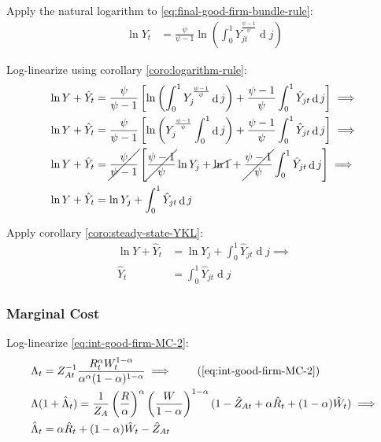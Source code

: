 \documentclass[
	12pt, 
	]{article}
\numberwithin{equation}{section}
\DeclareMathOperator{\dif}{d}
\theoremstyle{definition}
\theoremstyle{plain}
\theoremstyle{plain}
\theoremstyle{plain}
\begin{document}
Apply the natural logarithm to \ref{eq:final-good-firm-bundle-rule}:
\begin{align}
	\ln Y_t &= \frac{\psi}{\psi-1} \ln \left( \int_{0}^{1} Y_{jt}^{\frac{\psi-1}{\psi}} \dif j \right) \nonumber
\end{align}

Log-linearize using corollary \ref{coro:logarithm-rule}:
\begin{align}
	\ln Y + \hat{Y}_t &= \frac{\psi}{\psi-1} \left[ \ln \left( \int_{0}^{1} Y_{j}^{\frac{\psi-1}{\psi}} \dif j \right) + \frac{\psi-1}{\psi} \int_{0}^{1} \hat{Y}_{jt} \dif j \right] \implies \nonumber
\\
	\ln Y + \hat{Y}_t &= \frac{\psi}{\psi-1} \left[ \ln \left( Y_{j}^{\frac{\psi-1}{\psi}} \int_{0}^{1} \dif j \right) + \frac{\psi-1}{\psi} \int_{0}^{1} \hat{Y}_{jt} \dif j \right] \implies \nonumber
\\
	\ln Y + \hat{Y}_t &= \cancel{\frac{\psi}{\psi-1}} \left[ \cancel{\frac{\psi-1}{\psi}} \ln Y_{j} + \cancel{\ln1} + \cancel{\frac{\psi-1}{\psi}} \int_{0}^{1} \hat{Y}_{jt} \dif j \right] \implies \nonumber
	\\
	\ln Y + \hat{Y}_t &= \ln Y_{j} + \int_{0}^{1} \hat{Y}_{jt} \dif j \nonumber
\end{align}

Apply corollary \ref{coro:steady-state-YKL}:
\begin{align}
	\ln Y + \hat{Y}_t &= \ln Y_{j} + \int_{0}^{1} \hat{Y}_{jt} \dif j \implies \nonumber \\
	\hat{Y}_t &= \int_{0}^{1} \hat{Y}_{jt} \dif j 
	\label{eq:ll-final-good-firm-bundle-rule}
\end{align}


\subsubsection{Marginal Cost}

Log-linearize \ref{eq:int-good-firm-MC-2}:
\begin{alignat}{2}
	& \Lambda_t = Z_{At}^{-1} \frac{R_t^{\alpha} W_t^{1-\alpha} }{ \alpha^{\alpha} (1-\alpha)^{1-\alpha} } \implies \tag{\ref{eq:int-good-firm-MC-2}} \\
	& \Lambda (1+ \hat{\Lambda}_t) = \frac{1}{Z_{A}} \left( \frac{R}{\alpha} \right)^{\alpha} \left( \frac{W}{1-\alpha} \right)^{1-\alpha} (1- \hat{Z}_{At} + \alpha \hat{R}_t + (1- \alpha) \hat{W}_t ) \implies \nonumber \\
	& \hat{\Lambda}_t = \alpha \hat{R}_t + (1- \alpha) \hat{W}_t - \hat{Z}_{At} \label{eq:ll-int-good-firm-MC-2}
\end{alignat}
\end{document}
